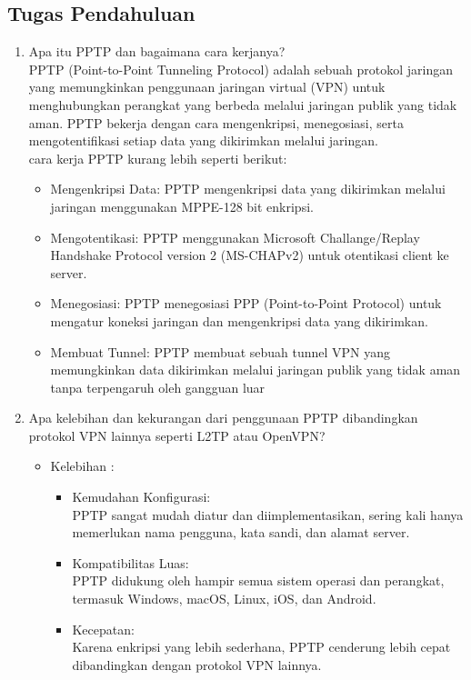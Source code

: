 \subsection{Tugas Pendahuluan}
\begin{enumerate}
	\item Apa itu PPTP dan bagaimana cara kerjanya?
	\\ \indent PPTP (Point-to-Point Tunneling Protocol) adalah sebuah protokol jaringan yang memungkinkan penggunaan jaringan virtual (VPN) untuk menghubungkan perangkat yang berbeda melalui jaringan publik yang tidak aman. 
	PPTP bekerja dengan cara mengenkripsi, menegosiasi, serta mengotentifikasi setiap data yang dikirimkan melalui jaringan. 
	\\ cara kerja PPTP kurang lebih seperti berikut:
	\begin{itemize}
		\item Mengenkripsi Data: PPTP mengenkripsi data yang dikirimkan melalui jaringan menggunakan MPPE-128 bit enkripsi.
		\item Mengotentikasi: PPTP menggunakan Microsoft Challange/Replay Handshake Protocol version 2 (MS-CHAPv2) untuk otentikasi client ke server.
		\item Menegosiasi: PPTP menegosiasi PPP (Point-to-Point Protocol) untuk mengatur koneksi jaringan dan mengenkripsi data yang dikirimkan.
		\item Membuat Tunnel: PPTP membuat sebuah tunnel VPN yang memungkinkan data dikirimkan melalui jaringan publik yang tidak aman tanpa terpengaruh oleh gangguan luar
	\end{itemize}

	\item Apa kelebihan dan kekurangan dari penggunaan PPTP dibandingkan protokol VPN lainnya seperti L2TP atau OpenVPN?
	
	\begin{itemize}
		\item Kelebihan :
		\begin{itemize}
			\item[\ding{58}] Kemudahan Konfigurasi: \\ PPTP sangat mudah diatur dan diimplementasikan, sering kali hanya memerlukan nama pengguna, kata sandi, dan alamat server.
			\item[\ding{58}] Kompatibilitas Luas: \\ PPTP didukung oleh hampir semua sistem operasi dan perangkat, termasuk Windows, macOS, Linux, iOS, dan Android.
			\item[\ding{58}] Kecepatan: \\ Karena enkripsi yang lebih sederhana, PPTP cenderung lebih cepat dibandingkan dengan protokol VPN lainnya.
		\end{itemize}


\end{itemize}
\end{enumerate}
